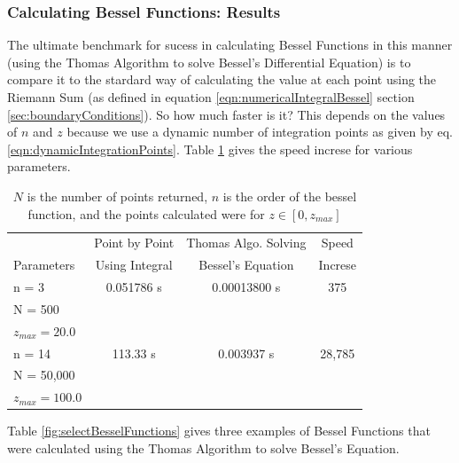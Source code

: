 \documentclass[onecolumn, groupedaddress, 10pt]{revtex4-1}
\begin{document}
\subsubsection{Calculating Bessel Functions: Results}
The ultimate benchmark for sucess in calculating Bessel Functions in this manner (using the Thomas Algorithm to solve Bessel's Differential Equation) is to compare it to the stardard way of calculating the value at each point using the Riemann Sum (as defined in equation \ref{eqn:numericalIntegralBessel} section \ref{sec:boundaryConditions}).  So how much faster is it?  This depends on the values of $n$ and $z$ because we use a dynamic number of integration points as given by eq. \ref{eqn:dynamicIntegrationPoints}. Table \ref{table:besselSpeed} gives the speed increse for various parameters.

\begin{table}[t]
	\centering
	\begin{tabular}{l || c | c | c }
		                  & Point by Point & Thomas Algo. Solving &  Speed	\\
		Parameters        & Using Integral &  Bessel's Equation   & Increse	\\
		\hline
		\hline
		n = 3             &   0.051786 s   &      0.00013800 s    &   375		\\
		N = 500           &                &                      &			\\
		$z_{max} = 20.0$  &                &                      &			\\
		\hline
		n = 14            &     113.33 s   &       0.003937 s     & 28,785	\\
		N = 50,000        &                &                      &           \\
		$z_{max} = 100.0$ &                &                      &           \\
	\end{tabular}
	\caption{\label{table:besselSpeed} $N$ is the number of points returned, $n$ is the order of the bessel function, and the points calculated were for $z \in [0,z_{max}]$ }
\end{table}

Table \ref{fig:selectBesselFunctions} gives three examples of Bessel Functions that were calculated using the Thomas Algorithm to solve Bessel's Equation.
\end{document}
